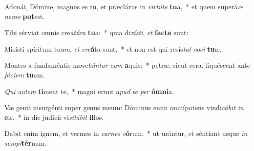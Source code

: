 \item Adonái, Dómine, magnus es tu, et præclárus in \textit{vir}\textit{tú}\textit{te} \textbf{tu}a,~* et quem superá\textit{re} \textit{ne}\textit{mo} \textbf{pot}est.
\item Tibi sérviat omnis cre\textit{a}\textit{tú}\textit{ra} \textbf{tu}a:~* quia di\textit{xís}\textit{ti}, \textit{et} \textbf{fac}\textbf{ta} sunt:
\item Misísti spíritum tu\textit{um}, \textit{et} \textit{cre}\textbf{á}ta sunt,~* et non est qui resís\textit{tat} \textit{vo}\textit{ci} \textbf{tu}æ.
\item Montes a fundaméntis move\textit{bún}\textit{tur} \textit{cum} \textbf{a}quis:~* petræ, sicut cera, liquéscent ante \textit{fá}\textit{ci}\textit{em} \textbf{tu}am.
\item \textit{Qui} \textit{au}\textit{tem} \textbf{ti}ment te,~* magni erunt a\textit{pud} \textit{te} \textit{per} \textbf{óm}\textbf{ni}a.
\item Væ genti insurgénti super genus meum: Dóminus enim omnípotens vindi\textit{cá}\textit{bit} \textit{in} \textbf{e}is,~* in die judícii vi\textit{si}\textit{tá}\textit{bit} \textbf{il}los.
\item Dabit enim ignem, et vermes in \textit{car}\textit{nes} \textit{e}\textbf{ó}rum,~* ut urántur, et séntiant usque \textit{in} \textit{sem}\textit{pi}\textbf{tér}num.
